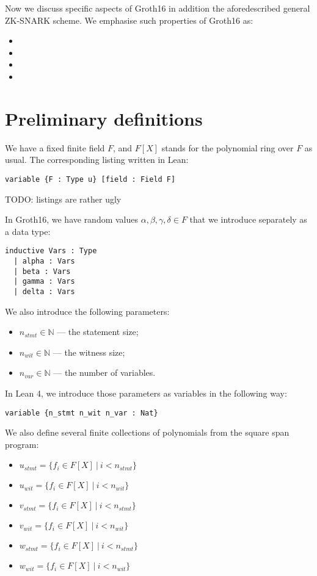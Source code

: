 \documentclass{article}
\theoremstyle{definition}
\theoremstyle{remark}
\begin{document}
Now we discuss specific aspects of Groth16 in addition the aforedescribed general ZK-SNARK scheme.
We emphasise such properties of Groth16 as:
\begin{itemize}
\item
\item
\item
\item
\end{itemize}

\section{Preliminary definitions}

We have a fixed finite field $F$, and $F[X]$ stands for the polynomial ring over $F$ as usual. The corresponding listing written in Lean:

\begin{lstlisting}
variable {F : Type u} [field : Field F]
\end{lstlisting}
TODO: listings are rather ugly


In Groth16, we have random values $\alpha, \beta, \gamma, \delta \in F$ that we introduce separately as a data type:
\begin{lstlisting}
inductive Vars : Type
  | alpha : Vars
  | beta : Vars
  | gamma : Vars
  | delta : Vars
\end{lstlisting}

We also introduce the following parameters:

\begin{itemize}
\item $n_{stmt} \in \mathbb{N}$ --- the statement size;
\item $n_{wit} \in \mathbb{N}$ --- the witness size;
\item $n_{var} \in \mathbb{N}$ --- the number of variables.
\end{itemize}

In Lean 4, we introduce those parameters as variables in the following way:

\begin{lstlisting}
variable {n_stmt n_wit n_var : Nat}
\end{lstlisting}

We also define several finite collections of polynomials from the square span program:

\begin{itemize}
\item $u_{stmt} = \{ f_{i} \in F[X] \: | \: i < n_{stmt} \}$
\item $u_{wit} = \{ f_{i} \in F[X] \: | \: i < n_{wit} \}$
\item $v_{stmt} = \{ f_{i} \in F[X] \: | \: i < n_{stmt} \}$
\item $v_{wit} = \{ f_{i} \in F[X] \: | \: i < n_{wit} \}$
\item $w_{stmt} = \{ f_{i} \in F[X] \: | \: i < n_{stmt} \}$
\item $w_{wit} = \{ f_{i} \in F[X] \: | \: i < n_{wit} \}$
\end{itemize}
\end{document}
